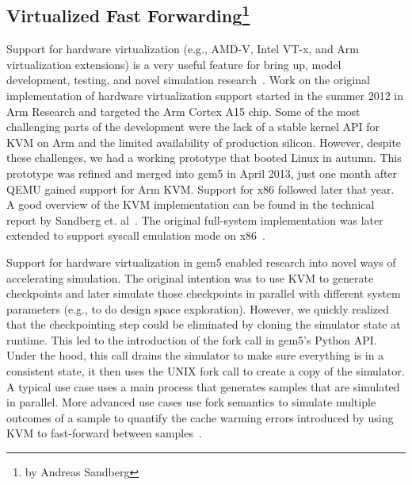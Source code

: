 \subsection[Virtualized Fast Forwarding]{Virtualized Fast Forwarding\footnote{by Andreas Sandberg}}
\label{sec:virtualized-ff}

Support for hardware virtualization (e.g., AMD-V, Intel VT-x, and Arm virtualization extensions) is a very useful feature for bring up, model development, testing, and novel simulation research~\cite{full-speed-ahead, NikolerisSHC16, NikolerisEHC19}.
Work on the original implementation of hardware virtualization support started in the summer 2012 in Arm Research and targeted the Arm Cortex A15 chip. Some of the most challenging parts of the development were the lack of a stable kernel API for KVM on Arm and the limited availability of production silicon.
However, despite these challenges, we had a working prototype that booted Linux in autumn.
This prototype was refined and merged into gem5 in April 2013, just one month after QEMU gained support for Arm KVM.
Support for x86 followed later that year.
A good overview of the KVM implementation can be found in the technical report by Sandberg et. al~\cite{full-speed-ahead}.
The original full-system implementation was later extended to support syscall emulation mode on x86~\cite{DutuSlice2015-kvm}.

Support for hardware virtualization in gem5 enabled research into novel ways of accelerating simulation.
The original intention was to use KVM to generate checkpoints and later simulate those checkpoints in parallel with different system parameters (e.g., to do design space exploration).
However, we quickly realized that the checkpointing step could be eliminated by cloning the simulator state at runtime.
This led to the introduction of the fork call in gem5's Python API.
Under the hood, this call drains the simulator to make sure everything is in a consistent state, it then uses the UNIX fork call to create a copy of the simulator.
A typical use case uses a main process that generates samples that are simulated in parallel.
More advanced use cases use fork semantics to simulate multiple outcomes of a sample to quantify the cache warming errors introduced by using KVM to fast-forward between samples~\cite{full-speed-ahead}.
